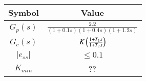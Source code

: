  \begin{tabular}{|c|c|}
        \hline
        \textbf{Symbol}  & \textbf{Value} \\
        \hline
        $G_p(s)$ & $\frac{2.2}{(1+0.1s)(1+0.4s)(1+1.2s)}$\\
         \hline
        $G_c(s)$& $K\left(\frac{1+T_1s}{1+T_2s}\right)$  \\
         \hline
        $|e_{ss}|$& $\leq 0.1$\\
         \hline
        $K_{min}$& ??\\
        \hline
    \end{tabular}
